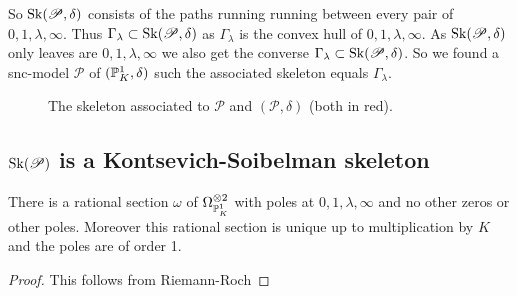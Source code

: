 So $\operatorname{Sk}(\mathscr P, \delta)$ consists of the paths running running between every pair of $0, 1, \lambda, \infty$. Thus $\Gamma_\lambda \subset \operatorname{Sk}(\mathscr P, \delta)$ as $\Gamma_\lambda$ is the convex hull of $0, 1, \lambda, \infty$.
As $\operatorname{Sk}(\mathscr P, \delta)$ only leaves are $0, 1, \lambda, \infty$ we also get the converse $\Gamma_\lambda \subset  \operatorname{Sk}(\mathscr P, \delta)$. 
So we found a snc-model $\mathscr P$ of $(\mathbb{P}^{1}_K, \delta)$ such the associated skeleton equals $\Gamma_\lambda$. 

\begin{figure}[ht]
    \centering
    \caption{The skeleton associated to $\mathscr P$ and $(\mathscr P, \delta)$ (both in red).}
    \label{fig:skeleton-of-the-pair}
\end{figure}

\subsection{$\operatorname{Sk}(\mathscr P)$ is a Kontsevich-Soibelman skeleton} \label{sec:$\sk(\mathscr_p)$_is_a_kontsevich-soibelman_skeleton}

\begin{lemma}
	There is a rational section $\omega$ of $\Omega_{\mathbb{P}^{1}_K}^{\otimes 2}$ with poles at  $0, 1, \lambda, \infty$ and no other zeros or other poles. 
	Moreover this rational section is unique up to multiplication by $K$ and the poles are of order 1. 
\end{lemma}
\begin{proof}
	This follows from Riemann-Roch
\end{proof}





